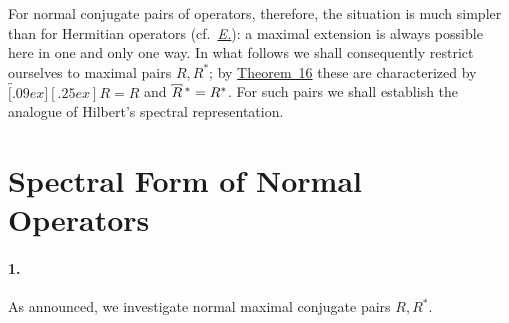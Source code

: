 \documentclass[
  paper=b5,
  twoside=true,
  fontsize=13pt,
  headings=normal,
  bookmarkpackage=false
]{scrartcl}
\theoremstyle{definition}
\newcommand{\TheoremRef}[1]{\hyperref[thm:#1]{Theorem~#1}}
\newcommand{\Eref}{\hyperref[fn:E-paper]{\emph{E.}}}
\newcommand{\MaximalExtension}[1]{\overbracket[.09ex][.25ex]{#1}}
\newcommand{\AdjointMaximalExtension}[1]{\MaximalExtension{#1}\vphantom{#1}^{*}}
\begin{document}
For normal conjugate pairs of operators, therefore, the situation is
much simpler than for Hermitian operators (cf.\ \Eref): a maximal
extension is always possible here in one and only one way.  In what
follows we shall consequently restrict ourselves to maximal pairs
\(R,R^*\); by \TheoremRef{16} these are characterized by
\(\MaximalExtension{R}=R\) and \(\AdjointMaximalExtension{R}=R^*\). For such pairs we shall establish the analogue of Hilbert's spectral
representation.

\section{Spectral Form of Normal Operators}
\label{sec:v-spectral-form}

\paragraph*{1.}\label{sec:v-1}
As announced, we investigate normal maximal conjugate pairs \(R,R^*\).
\end{document}
